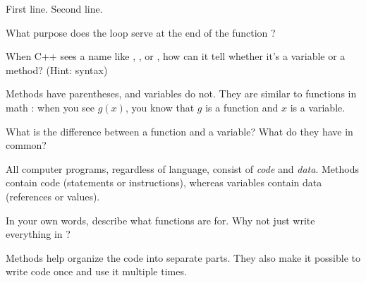 \begin{answer}[8em]
\vspace{-1ex}
\begin{javaans}
First line.\n
\n
\n
\n
Second line.\n
\end{javaans}
\end{answer}

\Q \label{times}
What purpose does the  loop serve at the end of the function
?
\vspace{10em}




\Q When C++ sees a name like , , or , how can it tell whether it's a variable or a method? (Hint: syntax)

\begin{answer}[5em]
Methods have parentheses, and variables do not.
They are similar to functions in math  : when you see $g(x)$, you know that $g$ is a function and $x$ is a variable.
\end{answer}


\Q What is the difference between a function and a variable? What do they have in common?

\begin{answer}[5em]
All computer programs, regardless of language, consist of \emph{code} and \emph{data}.
Methods contain code (statements or instructions), whereas variables contain data (references or values).
\end{answer}


\Q In your own words, describe what functions are for. Why not just write everything in ?

\begin{answer}[5em]
Methods help organize the code into separate parts.
They also make it possible to write code once and use it multiple times.
\end{answer}

